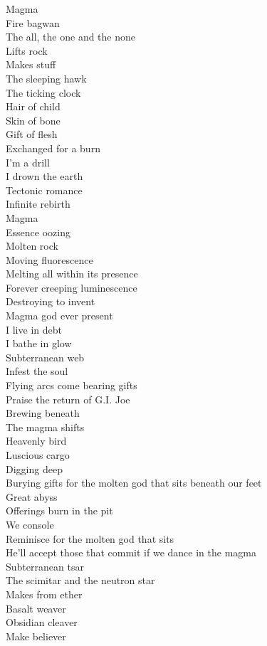 Magma \\
Fire bagwan \\
The all, the one and the none \\
Lifts rock \\
Makes stuff \\
The sleeping hawk \\
The ticking clock \\
Hair of child \\
Skin of bone \\
Gift of flesh \\
Exchanged for a burn \\
I'm a drill \\
I drown the earth \\
Tectonic romance \\
Infinite rebirth \\
Magma \\
Essence oozing \\
Molten rock \\
Moving fluorescence \\
Melting all within its presence \\
Forever creeping luminescence \\
Destroying to invent \\
Magma god ever present \\
I live in debt \\
I bathe in glow \\
Subterranean web \\
Infest the soul \\
Flying arcs come bearing gifts \\
Praise the return of G.I. Joe \\
Brewing beneath \\
The magma shifts \\
Heavenly bird \\
Luscious cargo \\
Digging deep \\
Burying gifts for the molten god that sits beneath our feet \\
Great abyss \\
Offerings burn in the pit \\
We console \\
Reminisce for the molten god that sits \\
He'll accept those that commit if we dance in the magma \\
Subterranean tsar \\
The scimitar and the neutron star \\
Makes from ether \\
Basalt weaver \\
Obsidian cleaver \\
Make believer \\

